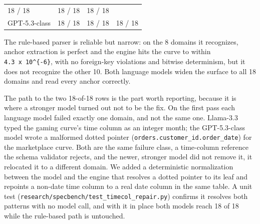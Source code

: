 \begin{longtable}[]{@{}llll@{}}
\begin{minipage}[t]{0.22\columnwidth}
18 / 18\strut
\end{minipage} & \begin{minipage}[t]{0.22\columnwidth}\raggedright
18 / 18\strut
\end{minipage} & \begin{minipage}[t]{0.22\columnwidth}\raggedright
18 / 18\strut
\end{minipage}\tabularnewline
\begin{minipage}[t]{0.22\columnwidth}\raggedright
GPT-5.3-class\strut
\end{minipage} & \begin{minipage}[t]{0.22\columnwidth}\raggedright
18 / 18\strut
\end{minipage} & \begin{minipage}[t]{0.22\columnwidth}\raggedright
18 / 18\strut
\end{minipage} & \begin{minipage}[t]{0.22\columnwidth}\raggedright
18 / 18\strut
\end{minipage}\tabularnewline
\bottomrule
\end{longtable}

The rule-based parser is reliable but narrow: on the 8 domains it
recognizes, anchor extraction is perfect and the engine hits the curve
to within \texttt{4.3\ x\ 10\^{}\{-6\}}, with no foreign-key violations
and bitwise determinism, but it does not recognize the other 10. Both
language models widen the surface to all 18 domains and read every
anchor correctly.

The path to the two 18-of-18 rows is the part worth reporting, because
it is where a stronger model turned out not to be the fix. On the first
pass each language model failed exactly one domain, and not the same
one. Llama-3.3 typed the gaming curve's time column as an integer month;
the GPT-5.3-class model wrote a malformed dotted pointer
(\texttt{orders.customer\_\allowbreak{}id.order\_\allowbreak{}date}) for the marketplace curve.
Both are the same failure class, a time-column reference the schema
validator rejects, and the newer, stronger model did not remove it, it
relocated it to a different domain. We added a deterministic
normalization between the model and the engine that resolves a dotted
pointer to its leaf and repoints a non-date time column to a real date
column in the same table. A unit test
(\texttt{research/\allowbreak{}specbench/\allowbreak{}test\_\allowbreak{}timecol\_\allowbreak{}repair.py}) confirms it
resolves both patterns with no model call, and with it in place both
models reach 18 of 18 while the rule-based path is untouched.


